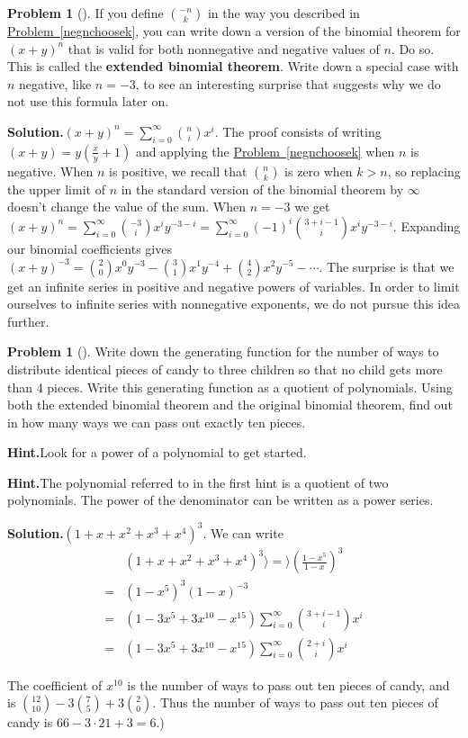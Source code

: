 \documentclass[10pt,]{book}
\newcommand{\terminology}[1]{\textbf{#1}}
\theoremstyle{plain}
\theoremstyle{definition}
\newtheorem{activity}[project]{Problem}
\theoremstyle{definition}
\numberwithin{equation}{chapter}
\newcommand{\amp}{&}
\begin{document}
\begin{activity}[]\label{activity-196}
If you define \(\binom{-n}{k}\) in the way you described in \hyperref[negnchoosek]{Problem~\ref{negnchoosek}}, you can write down a version of the binomial theorem for \((x+y)^n\) that is valid for both nonnegative and negative values of \(n\). Do so. This is called the \terminology{extended binomial theorem}. Write down a special case with \(n\) negative, like \(n=-3\), to see an interesting surprise that suggests why we do not use this formula later on.%
\par\medskip\noindent%
\textbf{Solution.}\quad \((x+y)^n=\sum_{i=0}^\infty\binom{n}{i}x^i\). The proof consists of writing \((x+y)=y(\frac{x}{y}+1)\) and applying the \hyperref[negnchoosek]{Problem~\ref{negnchoosek}} when \(n\) is negative. When \(n\) is positive, we recall that \(\binom{n}{k}\) is zero when \(k>n\), so replacing the upper limit of \(n\) in the standard version of the binomial theorem by \(\infty\) doesn't change the value of the sum. When \(n=-3\) we get \((x+y)^n = \sum_{i=0}^\infty \binom{-3}{i}x^iy^{-3-i} = \sum_{i=0}^\infty (-1)^i \binom{3+i-1}{i}x^iy^{-3-i}\). Expanding our binomial coefficients gives \((x+y)^{-3} = \binom{2}{0}x^0y^{-3} -\binom{3}{1}x^1y^{-4} + \binom{4}{2}x^2y^{-5}-\cdots.\) The surprise is that we get an infinite series in positive and negative powers of variables. In order to limit ourselves to infinite series with nonnegative exponents, we do not pursue this idea further.%
\end{activity}
\begin{activity}[]\label{candygenfn}
Write down the generating function for the number of ways to distribute identical pieces of candy to three children so that no child gets more than 4 pieces. Write this generating function as a quotient of polynomials. Using both the extended binomial theorem and the original binomial theorem, find out in how many ways we can pass out exactly ten pieces.%
\par\medskip\noindent%
\textbf{Hint.}\quad Look for a power of a polynomial to get started.%
\par\medskip\noindent%
\textbf{Hint.}\quad The polynomial referred to in the first hint is a quotient of two polynomials.  The power of the denominator can be written as a power series.%
\par\medskip\noindent%
\textbf{Solution.}\quad \((1+x+x^2+x^3+x^4)^3\). We can write%
\begin{align*}
\amp (1+x+x^2+x^3+x^4)^3 \rangle =\rangle \left(\frac{1-x^5}{1-x}\right)^3\\
=\amp (1-x^5)^3(1-x)^{-3}\\
=\amp (1-3x^5+3x^{10}-x^{15})\sum_{i=0}^\infty \binom{3+i-1}{i}x^i\\
=\amp (1-3x^5+3x^{10}-x^{15})\sum_{i=0}^\infty \binom{2+i}{i}x^i
\end{align*}
%
\par
The coefficient of \(x^{10}\) is the number of ways to pass out ten pieces of candy, and is \(\binom{12}{10}-3\binom{7}{5} +3\binom{2}{0}\).  Thus the number of ways to pass out ten pieces of candy is \(66-3\cdot21+3=6\).)%
\end{activity}
\end{document}
